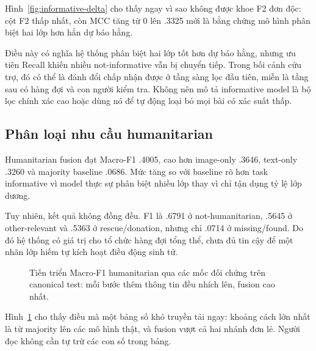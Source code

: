 Hình~\ref{fig:informative-delta} cho thấy ngay vì sao không được khoe F2 đơn
độc: cột F2 thấp nhất, còn MCC tăng từ 0 lên .3325 mới là bằng chứng mô hình
phân biệt hai lớp hơn hẳn dự báo hằng.

Điều này có nghĩa hệ thống phân biệt hai lớp tốt hơn dự báo hằng, nhưng ưu tiên
Recall khiến nhiều not-informative vẫn bị chuyển tiếp. Trong bối cảnh cứu trợ,
đó có thể là đánh đổi chấp nhận được ở tầng sàng lọc đầu tiên, miễn là tầng sau
có hàng đợi và con người kiểm tra. Không nên mô tả informative model là bộ lọc
chính xác cao hoặc dùng nó để tự động loại bỏ mọi bài có xác suất thấp.

\subsection{Phân loại nhu cầu humanitarian}

Humanitarian fusion đạt Macro-F1 .4005, cao hơn image-only .3646, text-only
.3260 và majority baseline .0686. Mức tăng so với baseline rõ hơn task
informative vì model thực sự phân biệt nhiều lớp thay vì chỉ tận dụng tỷ lệ
lớp dương.

Tuy nhiên, kết quả không đồng đều. F1 là .6791 ở not-humanitarian, .5645 ở
other-relevant và .5363 ở rescue/donation, nhưng chỉ .0714 ở missing/found.
Do đó hệ thống có giá trị cho tổ chức hàng đợi tổng thể, chưa đủ tin cậy để một
nhãn lớp hiếm tự kích hoạt điều động sinh tử.

\begin{figure}[H]
\centering
{}
\caption{Tiến triển Macro-F1 humanitarian qua các mốc đối chứng trên canonical
test: mỗi bước thêm thông tin đều nhích lên, fusion cao nhất.}
\label{fig:results-progression}
\end{figure}

Hình~\ref{fig:results-progression} cho thấy điều mà một bảng số khó truyền tải
ngay: khoảng cách lớn nhất là từ majority lên các mô hình thật, và fusion vượt
cả hai nhánh đơn lẻ. Người đọc không cần tự trừ các con số trong bảng.


